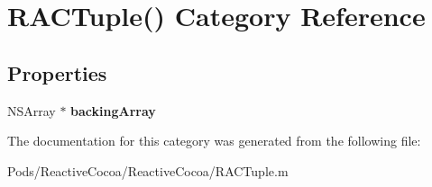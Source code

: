 \hypertarget{category_r_a_c_tuple_07_08}{}\section{R\+A\+C\+Tuple() Category Reference}
\label{category_r_a_c_tuple_07_08}
\subsection*{Properties}
\begin{DoxyCompactItemize}
\item 
\mbox{\label{category_r_a_c_tuple_07_08_a0f231f2e79ede42bebbff7cd97e44d5e}} 
N\+S\+Array $\ast$ {\bfseries backing\+Array}
\end{DoxyCompactItemize}


The documentation for this category was generated from the following file\+:\begin{DoxyCompactItemize}
\item 
Pods/\+Reactive\+Cocoa/\+Reactive\+Cocoa/R\+A\+C\+Tuple.\+m\end{DoxyCompactItemize}
